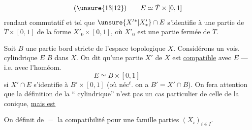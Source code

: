 \[
(\unsure{13|12})\qquad E\simeq\dot T\times[0,1]
\]
rendant commutatif
et tel que $\unsure{X'{}^*|X'_*}\cap E$ s'identifie à une partie
de $\dot T\times[0,1]$ de la forme $X'_0\times[0,1]$, où $X'_0$
est une partie fermée de $\dot T$.

Soit $B$ une partie bord stricte de l'espace
topologique $X$. Considérons un vois.
cylindrique $E$  $B$ dans $X$. On
dit qu'une partie  $X'$ de $X$ est \uline{compatible}
avec $E$ --- i.e. avec l'homéom.
\[
E\simeq B\times[0,1]\qquad -
\]
si $X'\cap E$ s'identifie à $B'\times[0,1]$
(où néc$^t$. on a $B'=X'\cap B$).
On fera attention que la définition de la
``
 cylindrique'' \uline{n'est pas} un cas
particulier de celle de la 
conique, \uline{mais est}

On définit de $=$ la compatibilité pour
une famille   parties $(X_i)_{i\in I}$.
